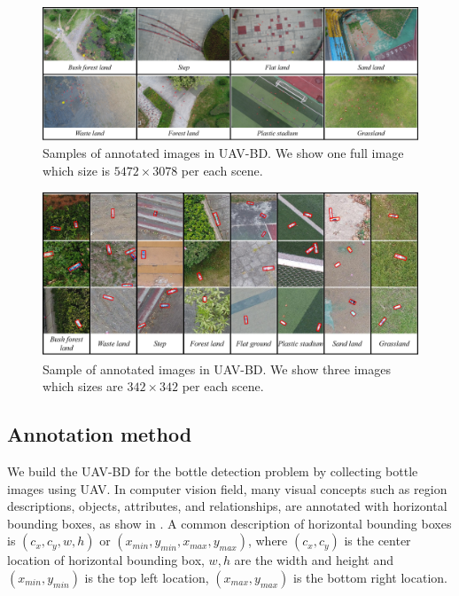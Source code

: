 \begin{figure}
	\includegraphics[width=\linewidth]{images/UAV-BD1.png}
	\caption{Samples of annotated images in UAV-BD. We show one full image which size is $ 5472\times 3078 $ per each scene.}
	\label{fig:dataset-original-image}
\end{figure}



\begin{figure}
	\includegraphics[width=\linewidth]{images/UAV-BD2.png}
	\caption{Sample of annotated images in UAV-BD. We show three images which sizes are $ 342\times 342 $ per each scene.}
	\label{fig:dataset-cut-image}
\end{figure}



\subsection{Annotation method}
\label{ssec:annotation_method}




We build the UAV-BD for the bottle detection problem by collecting bottle images using UAV. In computer vision field, many visual concepts such as region descriptions, objects, attributes, and relationships, are annotated with horizontal bounding boxes, as show in \cite{DOTA, boundingbox}. A common description of horizontal bounding boxes is $(c_x, c_y, w, h)$ or $ (x_{min}, y_{min}, x_{max}, y_{max}) $, where $(c_x, c_y)$ is the center location of horizontal bounding box, $w, h$ are the width and height and $ (x_{min}, y_{min}) $ is the top left location, $ (x_{max}, y_{max}) $ is the bottom right location\cite{DOTA}. 

